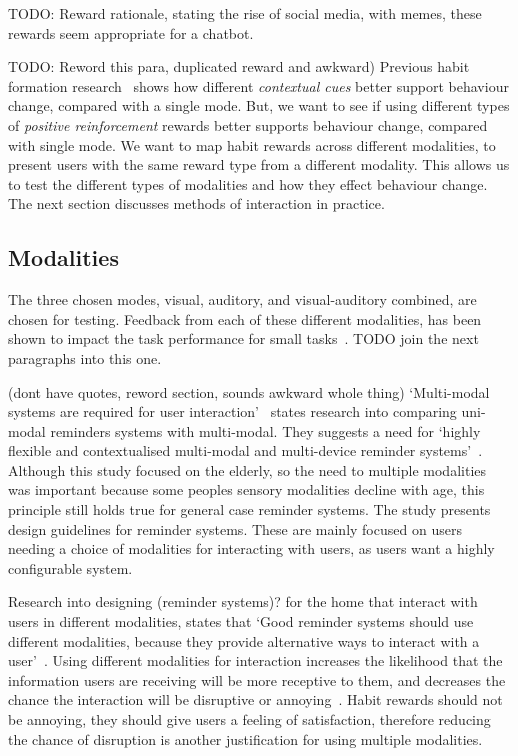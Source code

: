 \documentclass{scaffold/sigchi}
\begin{document}
TODO: Reward rationale, stating the rise of social media, with memes, these rewards seem appropriate for a chatbot.

TODO: Reword this para, duplicated reward and awkward) Previous habit formation research~\cite{article_understanding_use_contextual_cues_design_impl} shows how different \textit{contextual cues} better support behaviour change, compared with a single mode. But, we want to see if using different types of \textit{positive reinforcement} rewards better supports behaviour change, compared with single mode. We want to map habit rewards across different modalities, to present users with the same reward type from a different modality.
This allows us to test the different types of modalities and how they effect behaviour change.
The next section discusses methods of interaction in practice.

\subsection{Modalities}
The three chosen modes, visual, auditory, and visual-auditory combined, are chosen for testing. Feedback from each of these different modalities, has been shown to impact the task performance for small tasks~\cite{chi_oussama_tap_the_shapetones}. TODO join the next paragraphs into this one.


(dont have quotes, reword section, sounds awkward whole thing) `Multi-modal systems are required for user interaction'~\cite{article_user_centred_multimodal_reminders} states research into comparing uni-modal reminders systems with multi-modal.
They suggests a need for `highly flexible and contextualised multi-modal and multi-device reminder systems'~\cite{article_user_centred_multimodal_reminders}.
Although this study focused on the elderly, so the need to multiple modalities was important because some peoples sensory modalities decline with age,
this principle still holds true for general case reminder systems. The study presents design guidelines for reminder systems.
These are mainly focused on users needing a choice of modalities for interacting with users, as users want a highly configurable system.

Research into designing (reminder systems)? for the home that interact with users in different modalities, states that
`Good reminder systems should use different modalities, because they provide alternative ways to interact with a user'~\cite{article_designing_multimodal_reminders_for_home}.
Using different modalities for interaction increases the likelihood that the information users are receiving will be more receptive to them,
and decreases the chance the interaction will be disruptive or annoying~\cite{article_designing_multimodal_reminders_for_home}.
Habit rewards should not be annoying, they should give users a feeling of satisfaction, therefore reducing the chance of disruption is another justification for using multiple modalities.
\end{document}
